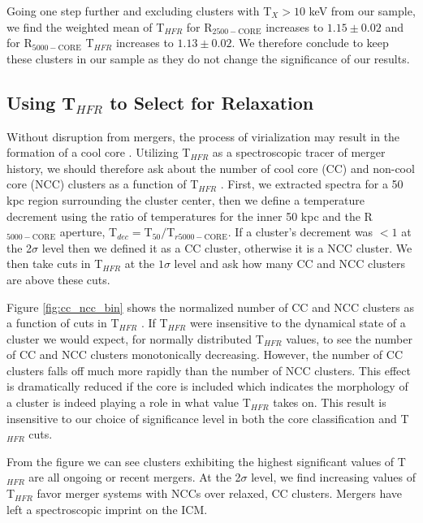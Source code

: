 \documentclass{emulateapj}
\newcommand{\tf}{T$_{HFR}$ }
\begin{document}
Going one step further and excluding clusters with T$_X > 10$ keV from
our sample, we find the weighted mean of \tf for R$_{2500-\text{CORE}}$
increases to $1.15\pm 0.02$ and for R$_{5000-\text{CORE}}$ \tf
increases to $1.13\pm 0.02$. We therefore conclude to keep these
clusters in our sample as they do not change the significance of our results.

\subsection{Using \tf to Select for Relaxation} \label{sec:cc_ncc}

Without disruption from mergers, the process of virialization may
result in the formation of a cool core \citep{2006ApJ...640..673O}.
Utilizing \tf as a spectroscopic tracer of merger history, we
should therefore ask about the number of cool core (CC) and non-cool core
(NCC) clusters as a function of \tf. First, we extracted
spectra for a 50 kpc region surrounding the cluster center, then we define
a temperature decrement using the ratio of temperatures for the inner
50 kpc and the R$_{5000-\text{CORE}}$ aperture, T$_{dec} =
$T$_{50}/$T$_{r5000-\text{CORE}}$. If a cluster's decrement was $< 1$ at the
2$\sigma$ level then we defined it as a CC cluster, otherwise it is a
NCC cluster. We then take cuts in \tf at the $1\sigma$
level and ask how many CC and NCC clusters are above these cuts.

Figure \ref{fig:cc_ncc_bin} shows the normalized number of CC
and NCC clusters as a function of cuts in \tf. If \tf were
insensitive to the dynamical state of a cluster we would expect, for
normally distributed \tf values, to see the number of CC
and NCC clusters monotonically decreasing. However, the number of CC
clusters falls off much more rapidly than the number of NCC
clusters. This effect is dramatically reduced if the core is included
which indicates the morphology of a cluster is indeed playing a role
in what value \tf takes on. This result is insensitive to our
choice of significance level in both the core classification and
\tf cuts.

From the figure we can see clusters exhibiting the highest significant
values of \tf are all ongoing or recent mergers. At the 2$\sigma$ level, we
find increasing values of \tf favor merger systems with NCCs
over relaxed, CC clusters. Mergers have left a spectroscopic imprint
on the ICM.
\end{document}
